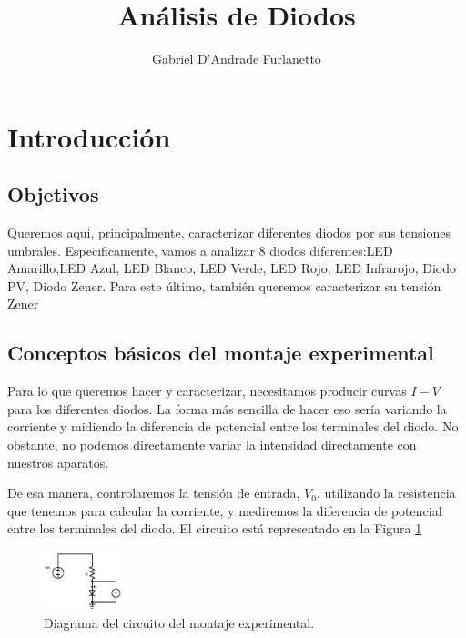 \documentclass[a4paper,12pt]{article}
\begin{document}
\title{Análisis de Diodos}
\author{Gabriel D'Andrade Furlanetto}
\maketitle


\section{Introducción}

\subsection{Objetivos}
Queremos aqui, principalmente, caracterizar diferentes diodos por sus tensiones umbrales. Especificamente, vamos a analizar 8 diodos diferentes:LED Amarillo,LED Azul, LED Blanco, LED Verde, LED Rojo, LED Infrarojo, Diodo PV, Diodo Zener. Para este último, también queremos caracterizar su tensión Zener

\subsection{Conceptos básicos del montaje experimental}
Para lo que queremos hacer y caracterizar, necesitamos producir curvas $I-V$ para los diferentes diodos. La forma más sencilla de hacer eso sería variando la corriente y midiendo la diferencia de potencial entre los terminales del diodo. No obstante, no podemos directamente variar la intensidad directamente con nuestros aparatos.

De esa manera, controlaremos la tensión de entrada, $V_0$, utilizando la resistencia que tenemos para calcular la corriente, y mediremos la diferencia de potencial entre los terminales del diodo. El circuito está representado en la Figura \ref{diagrama}

\begin{figure}[H]
	\centering
	\includegraphics[width=0.2\textwidth]{diagram.jpg}
	\caption{Diagrama del circuito del montaje experimental.}
	\label{diagrama}
\end{figure}
\end{document}
